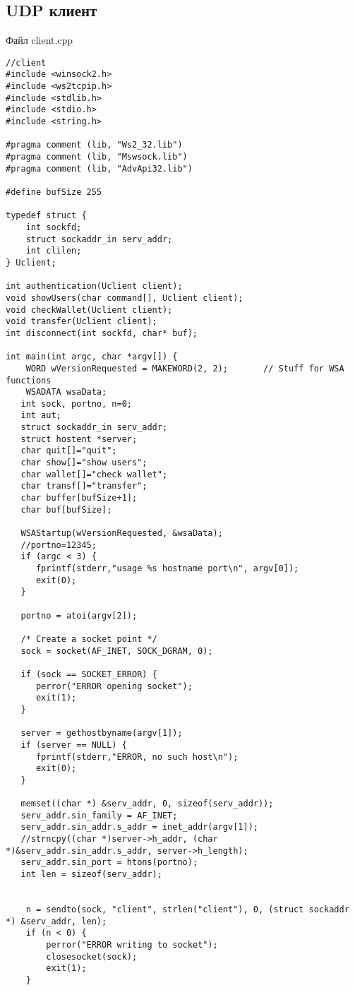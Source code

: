 \documentclass[12pt,a4paper]{report}
\begin{document}
\subsection*{UDP клиент}
Файл client.cpp
\begin{lstlisting}
//client
#include <winsock2.h>
#include <ws2tcpip.h>
#include <stdlib.h>
#include <stdio.h>
#include <string.h>

#pragma comment (lib, "Ws2_32.lib")
#pragma comment (lib, "Mswsock.lib")
#pragma comment (lib, "AdvApi32.lib")

#define bufSize 255

typedef struct {
	int sockfd;
	struct sockaddr_in serv_addr;
	int clilen;
} Uclient;

int authentication(Uclient client);
void showUsers(char command[], Uclient client);
void checkWallet(Uclient client);
void transfer(Uclient client);
int disconnect(int sockfd, char* buf);

int main(int argc, char *argv[]) {
	WORD wVersionRequested = MAKEWORD(2, 2);       // Stuff for WSA functions
	WSADATA wsaData;
   int sock, portno, n=0;
   int aut;
   struct sockaddr_in serv_addr;
   struct hostent *server;
   char quit[]="quit";
   char show[]="show users";
   char wallet[]="check wallet";
   char transf[]="transfer";
   char buffer[bufSize+1];
   char buf[bufSize];

   WSAStartup(wVersionRequested, &wsaData);
   //portno=12345;
   if (argc < 3) {
      fprintf(stderr,"usage %s hostname port\n", argv[0]);
      exit(0);
   }

   portno = atoi(argv[2]);

   /* Create a socket point */
   sock = socket(AF_INET, SOCK_DGRAM, 0);

   if (sock == SOCKET_ERROR) {
      perror("ERROR opening socket");
      exit(1);
   }

   server = gethostbyname(argv[1]);
   if (server == NULL) {
      fprintf(stderr,"ERROR, no such host\n");
      exit(0);
   }

   memset((char *) &serv_addr, 0, sizeof(serv_addr));
   serv_addr.sin_family = AF_INET;
   serv_addr.sin_addr.s_addr = inet_addr(argv[1]);
   //strncpy((char *)server->h_addr, (char *)&serv_addr.sin_addr.s_addr, server->h_length);
   serv_addr.sin_port = htons(portno);
   int len = sizeof(serv_addr);


	n = sendto(sock, "client", strlen("client"), 0, (struct sockaddr *) &serv_addr, len);
	if (n < 0) {
        perror("ERROR writing to socket");
        closesocket(sock);
        exit(1);
    }


\end{lstlisting}
\end{document}
